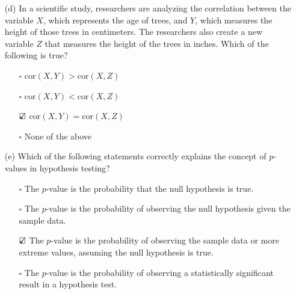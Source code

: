 \documentclass{./../../Latex/tests}
\begin{document}
\begin{enumerate}
\newpage
\item[(d)] In a scientific study, researchers are analyzing the correlation between the variable \( X \), which represents the age of trees, and \( Y \), which measures the height of those trees in centimeters. The researchers also create a new variable \( Z \) that measures the height of the trees in inches. Which of the following is true?

\begin{itemize}
\item[$\square$] \( \text{cor}(X, Y) >\text{cor}(X, Z) \)
\item[$\square$] \( \text{cor}(X, Y) < \text{cor}(X, Z) \)
\item[$\text{\rlap{$\checkmark$}}\square$] \( \text{cor}(X, Y) = \text{cor}(X, Z) \)
\item[$\square$] None of the above \\
\end{itemize}


\item[(e)] Which of the following statements correctly explains the concept of $p$-values in hypothesis testing?
\begin{enumerate}
\item[$\square$] The $p$-value is the probability that the null hypothesis is true.
\item[$\square$] The $p$-value is the probability of observing the null hypothesis given the sample data.
\item[$\text{\rlap{$\checkmark$}}\square$] The $p$-value is the probability of observing the sample data or more extreme values, assuming the null hypothesis is true.
\item[$\square$] The $p$-value is the probability of observing a statistically significant result in a hypothesis test.
\end{enumerate}
\end{enumerate}
\end{document}
